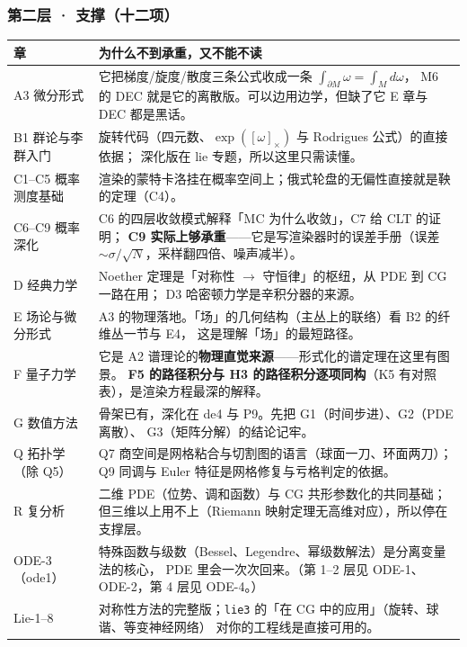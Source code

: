 \subsubsection{第二层 · 支撑（十二项）}

\begin{center}
\begin{tabular}{L{2.5cm}L{12.0cm}}
\toprule
\textbf{章} & \textbf{为什么不到承重，又不能不读} \\
\midrule
A3 微分形式 & 它把梯度/旋度/散度三条公式收成一条 $\int_{\partial M}\omega=\int_M d\omega$，
M6 的 DEC 就是它的离散版。可以边用边学，但缺了它 E 章与 DEC 都是黑话。 \\
B1 群论与李群入门 & 旋转代码（四元数、$\exp([\omega]_\times)$ 与 Rodrigues 公式）的直接依据；
深化版在 lie 专题，所以这里只需读懂。 \\
C1--C5 概率测度基础 & 渲染的蒙特卡洛挂在概率空间上；俄式轮盘的无偏性直接就是鞅的定理（C4）。 \\
C6--C9 概率深化 & C6 的四层收敛模式解释「MC 为什么收敛」，C7 给 CLT 的证明；
\textbf{C9 实际上够承重}——它是写渲染器时的误差手册（误差 $\sim\sigma/\sqrt N$，采样翻四倍、噪声减半）。 \\
D 经典力学 & Noether 定理是「对称性 $\to$ 守恒律」的枢纽，从 PDE 到 CG 一路在用；
D3 哈密顿力学是辛积分器的来源。 \\
E 场论与微分形式 & A3 的物理落地。「场」的几何结构（主丛上的联络）看 B2 的纤维丛一节与 E4，
这是理解「场」的最短路径。 \\
F 量子力学 & 它是 A2 谱理论的\textbf{物理直觉来源}——形式化的谱定理在这里有图景。
\textbf{F5 的路径积分与 H3 的路径积分逐项同构}（K5 有对照表），是渲染方程最深的解释。 \\
G 数值方法 & 骨架已有，深化在 de4 与 P9。先把 G1（时间步进）、G2（PDE 离散）、
G3（矩阵分解）的结论记牢。 \\
Q 拓扑学（除 Q5） & Q7 商空间是网格粘合与切割图的语言（球面一刀、环面两刀）；
Q9 同调与 Euler 特征是网格修复与亏格判定的依据。 \\
R 复分析 & 二维 PDE（位势、调和函数）与 CG 共形参数化的共同基础；
但三维以上用不上（Riemann 映射定理无高维对应），所以停在支撑层。 \\
ODE-3（ode1） & 特殊函数与级数（Bessel、Legendre、幂级数解法）是分离变量法的核心，
PDE 里会一次次回来。（第 1--2 层见 ODE-1、ODE-2，第 4 层见 ODE-4。） \\
Lie-1--8 & 对称性方法的完整版；\texttt{lie3} 的「在 CG 中的应用」（旋转、球谐、等变神经网络）
对你的工程线是直接可用的。 \\
\bottomrule
\end{tabular}
\end{center}

